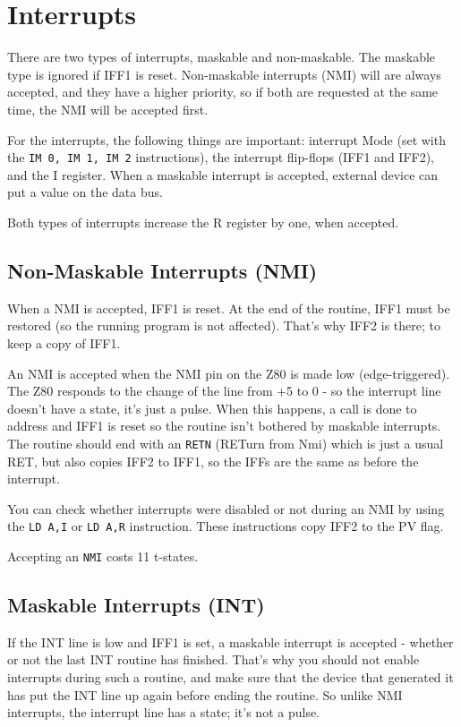 \pagebreak
\section{Interrupts}
\label{interrupts}

There are two types of interrupts, maskable and non-maskable. The maskable type is ignored if IFF1 is reset. Non-maskable interrupts (NMI) will are always accepted, and they have a higher priority, so if both are requested at the same time, the NMI will be accepted first.

For the interrupts, the following things are important: interrupt Mode (set with the {\tt IM 0, IM 1, IM 2} instructions), the interrupt flip-flops (IFF1 and IFF2), and the I register. When a maskable interrupt is accepted, external device can put a value on the data bus.

Both types of interrupts increase the R register by one, when accepted.


\subsection{Non-Maskable Interrupts (NMI)}

When a NMI is accepted, IFF1 is reset. At the end of the routine, IFF1 must be restored (so the running program is not affected). That's why IFF2 is there; to keep a copy of IFF1.

An NMI is accepted when the NMI pin on the Z80 is made low (edge-triggered). The Z80 responds to the change of the line from +5 to 0 - so the interrupt line doesn't have a state, it's just a pulse. When this happens, a call is done to address  and IFF1 is reset so the routine isn't bothered by maskable interrupts. The routine should end with an {\tt RETN} (RETurn from Nmi) which is just a usual RET, but also copies IFF2 to IFF1, so the IFFs are the same as before the interrupt.

You can check whether interrupts were disabled or not during an NMI by using the {\tt LD A,I} or {\tt LD A,R} instruction. These instructions copy IFF2 to the PV flag.

Accepting an {\tt NMI} costs 11 t-states.


\subsection{Maskable Interrupts (INT)}

If the INT line is low and IFF1 is set, a maskable interrupt is accepted - whether or not the last INT routine has finished. That's why you should not enable interrupts during such a routine, and make sure that the device that generated it has put the INT line up again before ending the routine. So unlike NMI interrupts, the interrupt line has a state; it's not a pulse.

